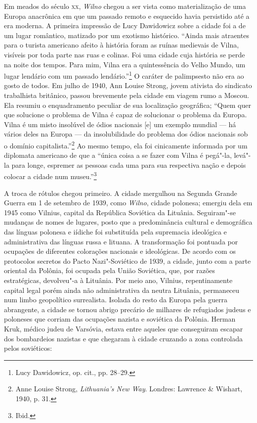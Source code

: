 %

Em meados do século \textsc{xx}, \textit{Wilno} chegou a ser vista como materialização de
uma Europa anacrônica em que um passado remoto e esquecido havia
persistido até a era moderna. A primeira impressão de Lucy Dawidowicz
sobre a cidade foi a de um lugar romântico, matizado por um exotismo
histórico. ``Ainda mais atraentes para o turista americano afeito à
história foram as ruínas medievais de Vilna, visíveis por toda parte nas
ruas e colinas. Foi uma cidade cuja história se perde na noite dos
tempos. Para mim, Vilna era a quintessência do Velho Mundo, um lugar
lendário com um passado lendário.''\footnote{Lucy Dawidowicz, op. cit., pp. 28--29.} O caráter de palimpsesto não era ao gosto de todos. Em julho de 1940, Ann Louise Strong, jovem ativista do sindicato
trabalhista britânico, passou brevemente pela cidade em viagem rumo a
Moscou. Ela resumiu o enquadramento peculiar de sua localização
geográfica; ``Quem quer que solucione o problema de Vilna é capaz de
solucionar o problema da Europa. Vilna é um misto insolúvel de ódios
nacionais {[}e{]} um exemplo mundial --- há vários deles na Europa --- da
insolubilidade do problema dos ódios nacionais sob o domínio
capitalista.''\footnote{Anne Louise Strong, \textit{Lithuania's New Way}. Londres: Lawrence \& Wishart, 1940, p. 31.} Ao mesmo tempo, ela foi cinicamente informada por um diplomata americano de que a ``única coisa
a se fazer com Vilna é pegá"-la, levá"-la para longe, espremer as pessoas
cada uma para sua respectiva nação e depois colocar a cidade num
museu.''\footnote{Ibid.}

A troca de rótulos chegou primeiro. A cidade mergulhou na Segunda Grande
Guerra em 1 de setembro de 1939, como \textit{Wilno}, cidade polonesa; emergiu
dela em 1945 como Vilnius, capital da República Soviética da Lituânia.
Seguiram"-se mudanças de nomes de lugares, posto que a predominância
cultural e demográfica das línguas polonesa e iídiche foi substituída
pela supremacia ideológica e administrativa das línguas russa e lituana.
A transformação foi pontuada por ocupações de diferentes colorações
nacionais e ideológicas. De acordo com os protocolos secretos do Pacto
Nazi"-Soviético de 1939, a cidade, junto com a parte oriental da Polônia,
foi ocupada pela União Soviética, que, por razões estratégicas,
devolveu"-a à Lituânia. Por meio ano, Vilnius, repentinamente capital
legal porém ainda não administrativa da neutra Lituânia, permaneceu num
limbo geopolítico surrealista. Isolada do resto da Europa pela guerra
abrangente, a cidade se tornou abrigo precário de milhares de refugiados
judeus e poloneses que corriam das ocupações nazista e soviética da
Polônia. Herman Kruk, médico judeu de Varsóvia, estava entre aqueles que
conseguiram escapar dos bombardeios nazistas e que chegaram à cidade
cruzando a zona controlada pelos soviéticos:


